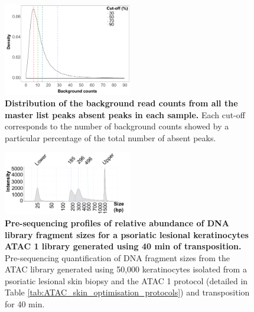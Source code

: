 \begin{figure}[htbp]
\centering
\includegraphics[width=0.5\textwidth]{./Appendix/pdfs/Chapter3/ATAC_absent_peaks_noise_distribution}
\caption[Distribution of the background read counts from all the master list peaks absent in each sample.]{\textbf{Distribution of the background read counts from all the master list peaks absent peaks in each sample.} Each cut-off corresponds to the number of background counts showed by a particular percentage of the total number of absent peaks.}
\label{figure:ATAC_absent_peaks_distribution}
\end{figure}

\begin{figure}[htbp]
\centering
\includegraphics[width=0.5\textwidth]{./Appendix/pdfs/Chapter3/ATAC_PS02_tapestation_40min}
\caption[Pre-sequencing profiles of relative abundance of DNA library fragment sizes for a psoriatic lesional keratinocytes ATAC 1 library generated using 40 min of transposition.]{\textbf{Pre-sequencing profiles of relative abundance of DNA library fragment sizes for a psoriatic lesional keratinocytes ATAC 1 library generated using 40 min of transposition.} Pre-sequencing quantification of DNA fragment sizes from the ATAC library generated using 50,000 keratinocytes isolated from a psoriatic lesional skin biopsy and the ATAC 1 protocol (detailed in Table \ref{tab:ATAC_skin_optimisation_protocols}) and transposition for 40 min.}
\label{figure:PS2_40min_tapestation}
\end{figure}




